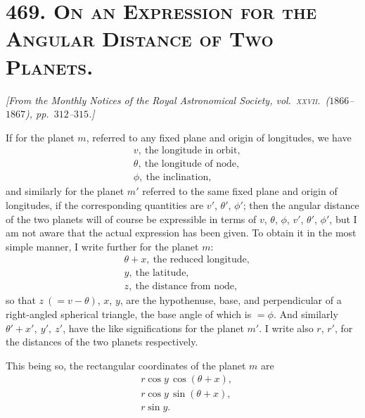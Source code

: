 \documentclass[11pt]{article}
\begin{document}
\section*{469. \textsc{On an Expression for the Angular Distance of Two Planets.}}

\begin{center}
\textit{[From the Monthly Notices of the Royal Astronomical Society,
vol.\ \textsc{xxvii}.\ ($1866$--$1867$), pp.\ $312$--$315$.]}
\end{center}

\medskip

If for the planet $m$, referred to any fixed plane and origin of
longitudes, we have
\begin{align*}
&v,\ \text{the longitude in orbit,}\\
&\theta,\ \text{the longitude of node,}\\
&\phi,\ \text{the inclination,}
\end{align*}
and similarly for the planet $m'$ referred to the same fixed plane and
origin of longitudes, if the corresponding quantities are $v'$,
$\theta'$, $\phi'$; then the angular distance of the two planets will
of course be expressible in terms of $v$, $\theta$, $\phi$, $v'$,
$\theta'$, $\phi'$, but I am not aware that the actual expression has
been given. To obtain it in the most simple manner, I write further
for the planet $m$:
\begin{align*}
&\theta + x,\ \text{the reduced longitude,}\\
&y,\ \text{the latitude,}\\
&z,\ \text{the distance from node,}
\end{align*}
so that $z\ (= v - \theta)$, $x$, $y$, are the hypothenuse, base, and
perpendicular of a right-angled spherical triangle, the base angle of
which is $=\phi$. And similarly $\theta' + x',\ y',\ z'$, have the like
significations for the planet $m'$. I write also $r$, $r'$, for the
distances of the two planets respectively.

This being so, the rectangular coordinates of the planet $m$ are
\begin{align*}
&r\cos y\,\cos(\theta + x), \\
&r\cos y\,\sin(\theta + x), \\
&r\sin y.
\end{align*}
\end{document}
